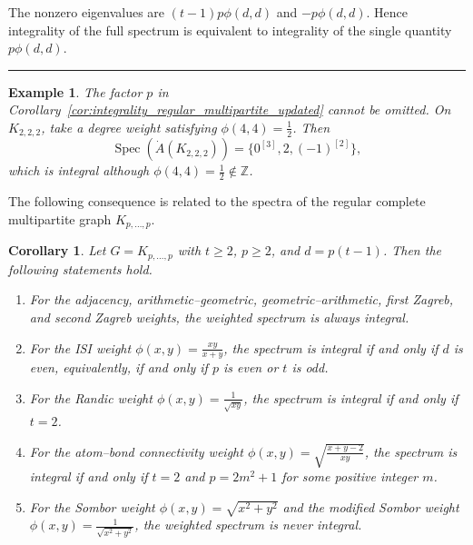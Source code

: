 \documentclass[12pt,twoside]{article}
\renewenvironment{proof}{{\noindent\bfseries Proof.}}{\qed}
\newcommand{\spec}{\operatorname{Spec}}
\newtheorem{example}[theorem]{Example}
\newtheorem{corollary}[theorem]{Corollary}
\def\qed{\nolinebreak\hfill\rule{.2cm}{.2cm}\par\addvspace{.5cm}}
\begin{document}
\begin{proof}
	The nonzero eigenvalues are $(t-1)p\phi(d,d)$ and $-p\phi(d,d)$. Hence integrality of the full spectrum is equivalent to integrality of the single quantity $p\phi(d,d)$.
\end{proof}

\begin{example}\label{ex:integrality_correction}
	The factor $p$ in Corollary~\ref{cor:integrality_regular_multipartite_updated} cannot be omitted. On $K_{2,2,2}$, take a degree weight satisfying $\phi(4,4)=\tfrac12$. Then
	$$
	\spec(\dot A(K_{2,2,2}))=\{0^{[3]},2,(-1)^{[2]}\},
	$$
	which is integral although $\phi(4,4)=\tfrac12\notin\mathbb Z$.
\end{example}

The following consequence is related to the spectra of the regular complete multipartite graph $K_{p,\ldots,p}.$
\begin{corollary}\label{cor:integrality_examples_updated}
	Let $G=K_{p,\ldots,p}$ with $t\ge 2$, $p\ge 2$, and $d=p(t-1)$. Then the following statements hold.
	\begin{enumerate}
		\item For the adjacency, arithmetic--geometric, geometric--arithmetic, first Zagreb, and second Zagreb weights, the weighted spectrum is always integral.
		\item For the ISI weight $\phi(x,y)=\tfrac{xy}{x+y}$, the spectrum is integral if and only if $d$ is even, equivalently, if and only if $p$ is even or $t$ is odd.
		\item For the Randic weight $\phi(x,y)=\tfrac{1}{\sqrt{xy}}$, the spectrum is integral if and only if $t=2$.
		\item For the atom--bond connectivity weight $\phi(x,y)=\sqrt{\tfrac{x+y-2}{xy}}$, the spectrum is integral if and only if $t=2$ and
		$
		p=2m^2+1
		$
		for some positive integer $m$.
		\item For the Sombor weight $\phi(x,y)=\sqrt{x^2+y^2}$ and the modified Sombor weight $\phi(x,y)=\tfrac{1}{\sqrt{x^2+y^2}}$, the weighted spectrum is never integral.
	\end{enumerate}
\end{corollary}
\end{document}

